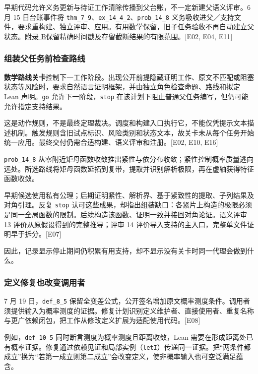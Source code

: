 早期代码允许义务更新与待证工作清除传播到父台账，不一定新建父语义评审。6 月 15 日台账事件将 \nolinkurl{thm_7_9}、\nolinkurl{ex_14_4_2}、\nolinkurl{prob_14_8} 义务吸收进父／支持文件，要求重构建、独立评审、应用。有用数学保留，旧子任务验收不再自动建立父状态。\hyperlink{appendix-b}{附录 B}保留精确时间戳及存留截断结果的有限范围。[E02, E04, E11]

\subsubsection[组装父任务前检查路线]{\texorpdfstring{\protect\hypertarget{l2-3}{}组装父任务前检查路线}{组装父任务前检查路线}}
\textbf{数学路线关卡}控制下一工作阶段。出现公开前提隐藏证明工作、原文不匹配或阻塞状态等风险时，要求自然语言证明框架，并由独立角色检查命题、路线和拟定 Lean 声明。\nolinkurl{go} 允许下一阶段，\nolinkurl{stop} 在该计划下阻止普通父任务编写，但仍可能允许指定支持结果。

这是动作规则，不是最终定理裁决。调度和构建入口执行它，不能仅凭提示文本描述机制。触发规则含旧试点标识、风险类别和状态文本，故关卡未从每个任务开始统一应用。最终交付仍需合适构建、语义评审和注册。[E02, E10, E16]

\nolinkurl{prob_14_8} 从零附近矩母函数收敛推出紧性与依分布收敛；紧性控制概率质量逃向远处。所选路线将矩母函数延拓到复带，提取并识别解析极限，再在虚轴获得特征函数收敛。

早期候选使用私有公理；后期证明紧性、解析界、基于紧致性的提取、子列结果及对角引理。反复 \nolinkurl{stop} 认可这些成果，却指出组装缺口：各紧片上构造的极限必须是同一全局函数的限制。后续构造该函数、证明一致并接回对角论证。语义评审 13 评价从原假设得到的完整推导；评审 14 评价导入支持的主入口，完整单文件证明早于拆分。[E07]

因此，记录显示停止期间仍积累有用支持，却不显示没有关卡时同一代理会做到什么。

\subsubsection[定义修复也改变调用者]{\texorpdfstring{\protect\hypertarget{l2-4}{}定义修复也改变调用者}{定义修复也改变调用者}}
7 月 19 日，\nolinkurl{def_8_5} 保留全变差公式，公开签名增加原文概率测度条件。调用者须提供输入为概率测度的证据。修复计划识别定义维护者、直接使用者、重复名称与更广依赖闭包，把工作从修改定义扩展为适配使用代码。[E08]

例如，\nolinkurl{def_10_5} 同时断言测度为概率测度且距离收敛，Lean 需要在形成距离处已有概率证据。修复通过依赖见证和局部实例（\nolinkurl{letI}）传递同一证据。把“两条件都成立”换为“若第一成立则第二成立”会改变定义，使非概率输入也可空泛满足蕴含。

